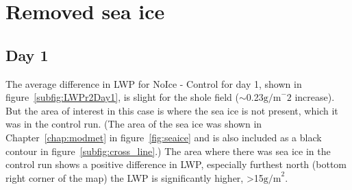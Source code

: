 \section{Removed sea ice}
\subsection{Day 1}
\label{sec:noiceDay1}
The average difference in LWP for NoIce - Control for day 1, shown in figure~\ref{subfig:LWPr2Day1}, is slight for the shole field ($\sim$0.23$\text{g/m}^-2$ increase). But the area of interest in this case is where the sea ice is not present, which it was in the control run. (The area of the sea ice was shown in Chapter~\ref{chap:modmet} in figure~\ref{fig:seaice} and is also included as a black contour in figure~\ref{subfig:cross_line}.) The area where there was sea ice in the control run shows a positive difference in LWP, especially furthest north (bottom right corner of the map) the LWP is significantly higher, >15$\text{g/m}^2$.
